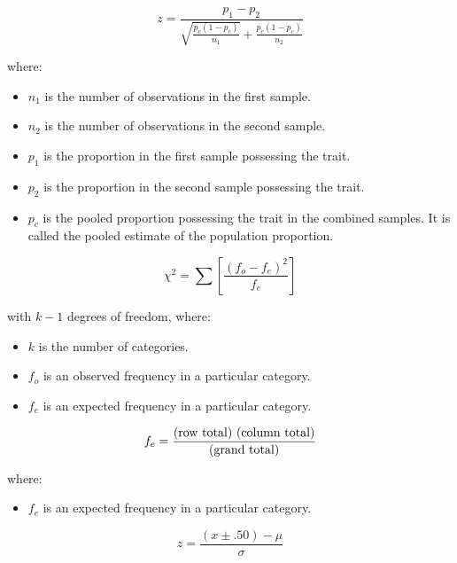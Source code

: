 \begin{equation}
\label{test hypothesis two sample test proportion}
z = \frac{p_{1} - p_{2}}{\sqrt{\frac{p_{c}(1 - p_{c})}{n_{1}}} + \frac{p_{c}(1 - p_{c})}{n_{2}}}
\end{equation}

where:
\begin{itemize}
 \item $n_{1}$ is the number of observations in the first sample.
 \item $n_{2}$ is the number of observations in the second sample.
 \item $p_{1}$ is the proportion in the first sample possessing the trait.
 \item $p_{2}$ is the proportion in the second sample possessing the trait.
 \item $p_{c}$ is the pooled proportion possessing the trait in the combined samples. It is called the pooled estimate of the population proportion.
\end{itemize}
\hformbar


\begin{equation}
\label{test hypothesis chi square test statistic}
\chi^2 = \sum\left[\frac{(f_o - f_e)^2}{f_e}\right]
\end{equation}

with $k - 1$ degrees of freedom, where:
\begin{itemize}
 \item $k$ is the number of categories.
 \item $f_o$ is an observed frequency in a particular category.
 \item $f_e$ is an expected frequency in a particular category.
 \end{itemize}
\hformbar


\begin{equation}
\label{expected frequency}
f_e =  \frac{\text{(row total) \text{(column total)}}}{\text{(grand total)}}
\end{equation}

where:
\begin{itemize}
 \item $f_e$ is an expected frequency in a particular category.
 \end{itemize}
\hformbar


\begin{equation}
\label{sign text n > 10}
z = \frac{(x \pm .50) - \mu}{\sigma}
\end{equation}

